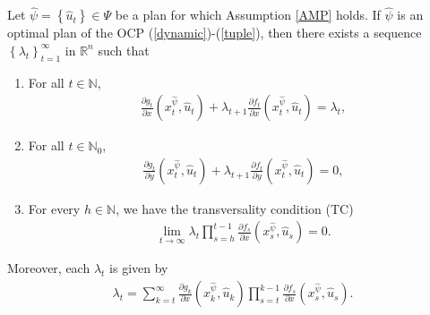 \documentclass[10pt,a4paper]{amsart}
\newcommand{\natu}{\mathbb N}
\newcommand{\nat}{\mathbb N_0}
\newcommand{\rzn}{\mathbb R^{n}}
\begin{document}
	\begin{thm}\label{MP}
		Let $\hat \psi=\left\lbrace\hat u_t \right\rbrace \in\Psi$ be a plan for which Assumption \ref{AMP} holds. If $\hat\psi$ is an optimal plan of the OCP (\ref{dynamic})-(\ref{tuple}), then there exists a sequence $\left\lbrace \lambda_t\right\rbrace_{t=1}^\infty$ in $\rzn$ such that
		\begin{enumerate}
			\item[(a)] For all $t\in\natu$,
			\begin{align}\label{MPX}
			\frac{\partial g_t}{\partial x}(x_t^{\hat\psi},\hat u_t)+\lambda_{t+1}\frac{\partial f_t}{\partial x}(x_t^{\hat\psi},\hat u_t)=\lambda_t,
			\end{align}
			\item[(b)] For all $t\in\nat$,
			\begin{align}\label{MPY}
			\frac{\partial g_t}{\partial y}(x_t^{\hat\psi},\hat u_t)+\lambda_{t+1}\frac{\partial f_t}{\partial y}(x_t^{\hat\psi},\hat u_t)=0,
			\end{align}
			\item[(c)] For every $h\in\natu$, we have the  transversality condition (TC)
			\begin{align}\label{TC}
			\lim_{t\to\infty}\lambda_t \prod_{s=h}^{t-1}\frac{\partial f_s}{\partial x}(x_s^{\hat\psi},\hat u_s)=0.
			\end{align}  
		\end{enumerate}
		Moreover, each $\lambda_t$ is given by 
		\begin{align}\label{multipliers}
		\lambda_t=\sum_{k=t}^\infty\frac{\partial g_k}{\partial x}(x_k^{\hat{\psi}},\hat u_k)\prod_{s=t}^{k-1}\frac{\partial f_s}{\partial x}(x_s^{\hat{\psi}},\hat u_s).
		\end{align}
	\end{thm}
\end{document}

